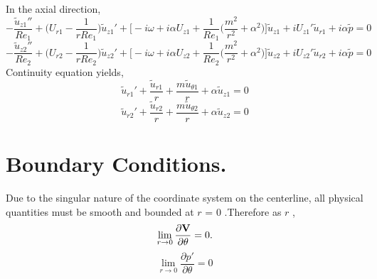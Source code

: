 \documentclass{article}
\begin{document}
In the axial direction,
\begin{equation}
\label{axilinear1}
-\frac{\tilde{u}_{z1}''}{Re_{1}} + \Bigg( U_{r1}-\frac{1}{rRe_{1}}\Bigg)\tilde{u}_{z1}' +
\Bigg[-i\omega + i\alpha U_{z1}  + \frac{1}{Re_{1}}\Bigg(\frac{m^2}{r^2}+ \alpha ^2\Bigg)\Bigg]\tilde{u}_{z1} + iU_{z1}'\tilde{u}_{r1} + i\alpha \tilde{p} = 0
\end{equation}
\begin{equation}
\label{axilinear2}
-\frac{\tilde{u}_{z2}''}{Re_{2}} + \Bigg( U_{r2}-\frac{1}{rRe_{2}}\Bigg)\tilde{u}_{z2}' +
\Bigg[-i\omega + i\alpha U_{z2}  + \frac{1}{Re_{2}}\Bigg(\frac{m^2}{r^2}+ \alpha ^2\Bigg)\Bigg]\tilde{u}_{z2} + iU_{z2}'\tilde{u}_{r2} + i\alpha \tilde{p} = 0
\end{equation}
Continuity equation yields,
\begin{equation}
\label{linearconti}
\tilde{u}_{r1}' + \frac{\tilde{u}_{r1}}{r} + \frac{m\tilde{u}_{\theta 1}}{r}+ 
\alpha \tilde{u}_{z1} = 0
\end{equation}
\begin{equation}
\label{linearconti}
\tilde{u}_{r2}' + \frac{\tilde{u}_{r2}}{r} + \frac{m\tilde{u}_{\theta 2}}{r}+ 
\alpha \tilde{u}_{z2} = 0
\end{equation}

\section{Boundary Conditions.}
Due to the singular nature of the coordinate system on the centerline, all physical quantities must be smooth and bounded at $r$ = 0 .Therefore as   $r$ ,
\begin{equation}
\lim _{r\rightarrow {0}}\frac{\partial \bf V}{\partial \theta} = 0.
\end{equation}
\begin{equation}
\lim_{r\rightarrow{0}}\frac{\partial p'}{\partial \theta} = 0
\end{equation}
\end{document}
